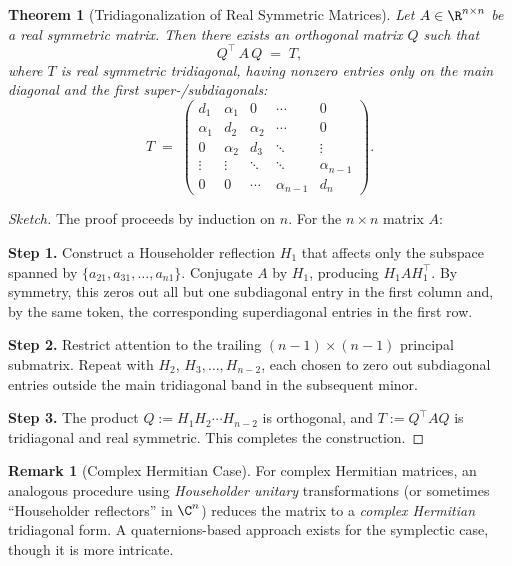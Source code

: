 \documentclass[letterpaper,11pt,oneside,reqno]{article}
\numberwithin{equation}{section}
\newtheorem{theorem}[proposition]{Theorem}
\theoremstyle{definition}
\newtheorem{remark}[proposition]{Remark}
\begin{document}
\begin{theorem}[Tridiagonalization of Real Symmetric Matrices]
\label{thm:tridiagonal}
Let $A\in \R^{n\times n}$ be a real symmetric matrix. Then there exists an orthogonal matrix $Q$ such that
\[
  Q^\top\,A\,Q \;=\; T,
\]
where $T$ is real symmetric \emph{tridiagonal}, having nonzero entries only on the main diagonal and the first super-/subdiagonals:
\[
  T \;=\;
  \begin{pmatrix}
     d_1 & \alpha_1 & 0 & \cdots & 0\\
     \alpha_1 & d_2 & \alpha_2 & \cdots & 0\\
     0 & \alpha_2 & d_3 & \ddots & \vdots\\
     \vdots & \vdots & \ddots & \ddots & \alpha_{n-1}\\
     0 & 0 & \cdots & \alpha_{n-1} & d_n
  \end{pmatrix}.
\]
\end{theorem}

\begin{proof}[Sketch]
The proof proceeds by induction on $n$. For the $n\times n$ matrix $A$:

\noindent
{\bf Step 1.} Construct a Householder reflection $H_1$ that affects only the subspace spanned by $\{a_{21},a_{31},\dots,a_{n1}\}$. Conjugate $A$ by $H_1$, producing $H_1 A H_1^\top$. By symmetry, this zeros out all but one subdiagonal entry in the first column and, by the same token, the corresponding superdiagonal entries in the first row.

\noindent
{\bf Step 2.} Restrict attention to the trailing $(n-1)\times(n-1)$ principal submatrix. Repeat with $H_2$, $H_3,\dots,H_{n-2}$, each chosen to zero out subdiagonal entries outside the main tridiagonal band in the subsequent minor.

\noindent
{\bf Step 3.} The product $Q := H_1 H_2 \cdots H_{n-2}$ is orthogonal, and $T := Q^\top A Q$ is tridiagonal and real symmetric. This completes the construction.
\end{proof}

\begin{remark}[Complex Hermitian Case]
For complex Hermitian matrices, an analogous procedure using \emph{Householder unitary} transformations (or sometimes “Householder reflectors” in $\C^n$) reduces the matrix to a \emph{complex Hermitian} tridiagonal form. A quaternions-based approach exists for the symplectic case, though it is more intricate.
\end{remark}
\end{document}
